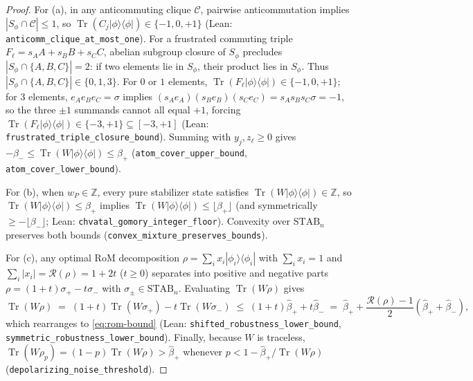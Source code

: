 \documentclass[11pt,a4paper]{article}
\theoremstyle{definition}
\theoremstyle{remark}
\newcommand{\Z}{\mathbb{Z}}
\newcommand{\STAB}{\mathrm{STAB}}
\newcommand{\RoM}{\mathcal{R}}
\newcommand{\Tr}{\operatorname{Tr}}
\newcommand{\Code}[1]{{\small\texttt{#1}}}
\begin{document}
\begin{proof}
For (a), in any anticommuting clique $\mathcal{C}$, pairwise anticommutation implies $|S_\phi \cap \mathcal{C}| \le 1$, so $\Tr(C_j |\phi\rangle\langle\phi|) \in \{-1, 0, +1\}$ (Lean: \Code{anticomm\_\allowbreak clique\_\allowbreak at\_\allowbreak most\_\allowbreak one}). For a frustrated commuting triple $F_\ell = s_A A + s_B B + s_C C$, abelian subgroup closure of $S_\phi$ precludes $|S_\phi \cap \{A, B, C\}| = 2$: if two elements lie in $S_\phi$, their product lies in $S_\phi$. Thus $|S_\phi \cap \{A, B, C\}| \in \{0, 1, 3\}$. For $0$ or $1$ elements, $\Tr(F_\ell |\phi\rangle\langle\phi|) \in \{-1, 0, +1\}$; for $3$ elements, $e_A e_B e_C = \sigma$ implies $(s_A e_A)(s_B e_B)(s_C e_C) = s_A s_B s_C \sigma = -1$, so the three $\pm 1$ summands cannot all equal $+1$, forcing $\Tr(F_\ell |\phi\rangle\langle\phi|) \in \{-3, +1\} \subseteq [-3, +1]$ (Lean: \Code{frustrated\_\allowbreak triple\_\allowbreak closure\_\allowbreak bound}). Summing with $y_j, z_\ell \ge 0$ gives $-\beta_- \le \Tr(W|\phi\rangle\langle\phi|) \le \beta_+$ (\Code{atom\_\allowbreak cover\_\allowbreak upper\_\allowbreak bound}, \Code{atom\_\allowbreak cover\_\allowbreak lower\_\allowbreak bound}).

For (b), when $w_P \in \Z$, every pure stabilizer state satisfies $\Tr(W|\phi\rangle\langle\phi|) \in \Z$, so $\Tr(W|\phi\rangle\langle\phi|) \le \beta_+$ implies $\Tr(W|\phi\rangle\langle\phi|) \le \lfloor \beta_+ \rfloor$ (and symmetrically $\ge -\lfloor \beta_- \rfloor$; Lean: \Code{chvatal\_\allowbreak gomory\_\allowbreak integer\_\allowbreak floor}). Convexity over $\STAB_n$ preserves both bounds (\Code{convex\_\allowbreak mixture\_\allowbreak preserves\_\allowbreak bounds}).

For (c), any optimal RoM decomposition $\rho = \sum_i x_i |\phi_i\rangle\langle\phi_i|$ with $\sum_i x_i = 1$ and $\sum_i |x_i| = \RoM(\rho) = 1 + 2t$ ($t \ge 0$) separates into positive and negative parts $\rho = (1 + t)\sigma_+ - t\sigma_-$ with $\sigma_\pm \in \STAB_n$. Evaluating $\Tr(W\rho)$ gives
\begin{equation}
  \Tr(W\rho) \;=\; (1 + t)\Tr(W\sigma_+) - t\Tr(W\sigma_-) \;\le\; (1 + t)\hat{\beta}_+ + t\hat{\beta}_- \;=\; \hat{\beta}_+ + \frac{\RoM(\rho) - 1}{2}(\hat{\beta}_+ + \hat{\beta}_-),
\end{equation}
which rearranges to \eqref{eq:rom-bound} (Lean: \Code{shifted\_\allowbreak robustness\_\allowbreak lower\_\allowbreak bound}, \Code{symmetric\_\allowbreak robustness\_\allowbreak lower\_\allowbreak bound}). Finally, because $W$ is traceless, $\Tr(W\rho_p) = (1 - p)\Tr(W\rho) > \hat{\beta}_+$ whenever $p < 1 - \hat{\beta}_+/\Tr(W\rho)$ (\Code{depolarizing\_\allowbreak noise\_\allowbreak threshold}).
\end{proof}
\end{document}
